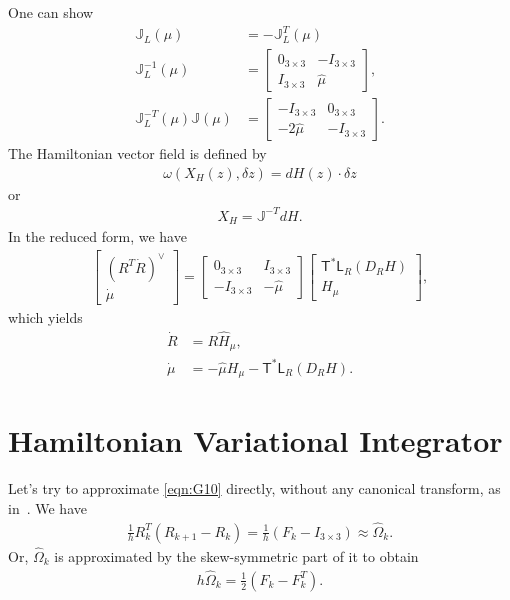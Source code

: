 \documentclass[letterpaper, 10pt, conference]{ieeeconf}
\newcommand{\T}{\ensuremath{\mathsf{T}}}
\renewcommand{\L}{\ensuremath{\mathsf{L}}}
\begin{document}
One can show
\begin{align*}
    \mathbb{J}_L(\mu) & = -\mathbb{J}_L^T(\mu) \\
    \mathbb{J}^{-1}_L(\mu) & = 
    \begin{bmatrix} 0_{3\times 3} & -I_{3\times 3}\\
        I_{3\times 3} & \hat\mu
    \end{bmatrix},\\
        \mathbb{J}^{-T}_L(\mu) \mathbb{J}(\mu) & =
    \begin{bmatrix} -I_{3\times 3} & 0_{3\times 3}\\
        -2 \hat\mu & -I_{3\times 3} 
    \end{bmatrix}.
\end{align*}
The Hamiltonian vector field is defined by
\begin{align*}
    \omega( X_H(z), \delta z) = dH(z) \cdot \delta z
\end{align*}
or
\begin{align*}
    X_H = \mathbb{J}^{-T} dH.
\end{align*}
In the reduced form, we have
\begin{align*}
    \begin{bmatrix} (R^T \dot R)^\vee \\ \dot \mu \end{bmatrix}
    =
    \begin{bmatrix} 0_{3\times 3} & I_{3\times 3}\\
        -I_{3\times 3} & -\hat\mu
    \end{bmatrix}
    \begin{bmatrix}
        \T^* \L_R (D_RH)\\
        H_\mu
    \end{bmatrix},
\end{align*}
which yields
\begin{align*}
    \dot R & = R \hat H_\mu,\\
    \dot \mu & = -\hat\mu H_\mu - \T^* \L_R (D_RH).
\end{align*}

\section{Hamiltonian Variational Integrator}

Let's try to approximate \eqref{eqn:G10} directly, without any canonical transform, as in~\cite{ma2010lie,de2018lie}. 
We have
\begin{align*}
    \frac{1}{h} R_k^T(R_{k+1}-R_k) = \frac{1}{h} (F_k - I_{3\times 3}) \approx \hat\Omega_k.
\end{align*}
Or, $\hat\Omega_k$ is approximated by the skew-symmetric part of it to obtain
\begin{align*}
    h\hat\Omega_k =\frac{1}{2}( F_k-F_k^T).
\end{align*}
\end{document}
